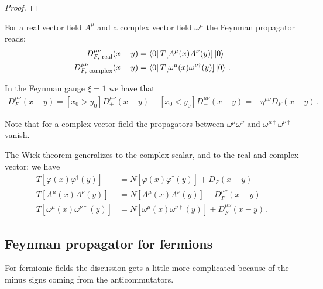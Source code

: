 \documentclass[main.tex]{subfiles}
\begin{document}
\begin{proof}
\end{proof}

\begin{definition}
For a real vector field \(A^{\mu }\) and a complex vector field \(\omega^{\mu }\) the Feynman propagator reads: 
%
\begin{align}
D^{\mu \nu }_{F, \text{ real}} (x-y) &= \bra{0} T[A^{\mu }(x) A^{\nu }(y) ]\ket{0} \\
D^{\mu \nu }_{F, \text{ complex}} (x-y) &= \bra{0} T[\omega^{\mu }(x) \omega^{\nu \dag}(y) ]\ket{0}
\,.
\end{align}
\end{definition}

\begin{claim}
In the Feynman gauge \(\xi = 1\) we have that 
%
\begin{align}
D^{\mu \nu }_{F} (x-y) = [x_0 > y_0 ]
D^{\mu \nu }_{+ } (x-y) 
+
[x_0 < y_0 ]
D^{\mu \nu }_{-}(x-y) 
= - \eta^{\mu \nu } D_F (x-y)
\,.
\end{align}
\end{claim}

Note that for a complex vector field the propagators between \(\omega^{\mu } \omega^{\nu }\) and \(\omega^{\mu \dag} \omega^{\nu \dag}\) vanish. 

The Wick theorem generalizes to the complex scalar, and to the real and complex vector: we have 
%
\begin{align}
T[\varphi (x) \varphi ^\dag (y)] &= N[\varphi (x) \varphi ^\dag (y)] + D_F (x-y) \\
T[A^{\mu } (x) A^{\nu } (y)] &= N[A^{\mu } (x) A^{\nu } (y)] + D_F^{\mu \nu } (x-y) \\
T[\omega^{\mu } (x) \omega^{\nu  \dag} (y)] &= N[\omega^{\mu } (x) \omega^{\nu \dag } (y)] + D_F^{\mu \nu } (x-y) 
\,.
\end{align}

\subsection{Feynman propagator for fermions}

For fermionic fields the discussion gets a little more complicated because of the minus signs coming from the anticommutators. 
\end{document}
